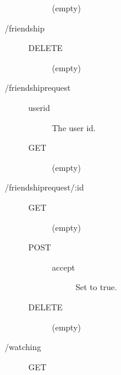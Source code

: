 \begin{description}
\begin{description}
        \begin{description}
          \item [(empty)]
        \end{description}
    \end{description}
  \item [/friendship] \hfill
    \begin{description}
      \item [DELETE] \hfill
        \begin{description}
          \item [(empty)]
        \end{description}
    \end{description}
  \item [/friendshiprequest] \hfill
    \begin{description}
      \item [userid] The user id.
    \end{description}
    \begin{description}
      \item [GET] \hfill
        \begin{description}
          \item [(empty)]
        \end{description}
    \end{description}
  \item [/friendshiprequest/:id] \hfill
    \begin{description}
      \item [GET] \hfill
        \begin{description}
          \item [(empty)]
        \end{description}
      \item [POST] \hfill
        \begin{description}
          \item [accept] Set to true.
        \end{description}
      \item [DELETE] \hfill
        \begin{description}
          \item [(empty)]
        \end{description}
    \end{description}
  \item [/watching] \hfill
    \begin{description}
      \item [GET] \hfill

\end{description}
\end{description}
